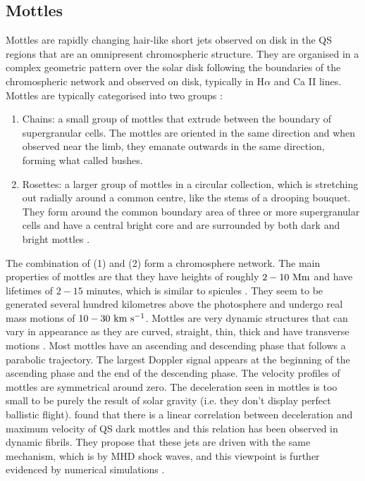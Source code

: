 \subsection{Mottles}
\label{subsec:mots}
Mottles are rapidly changing hair-like short jets observed on disk in the QS regions that are an omnipresent chromospheric structure. They are organised in a complex geometric pattern over the solar disk following the boundaries of the chromospheric network and observed on disk, typically in H$\alpha$ and Ca II lines. Mottles are typically categorised into two groups \citep{Beckers1963ApJ138648B}:
\begin{enumerate}
\item Chains: a small group of mottles that extrude between the boundary of supergranular cells. The mottles are oriented in the same direction and when observed near the limb, they emanate outwards in the same direction, forming what \cite{Cragg1963ApJ138303C} called bushes.
\item Rosettes: a larger group of mottles in a circular collection, which is stretching out radially around a common centre, like the stems of a drooping bouquet. They form around the common boundary area of three or more supergranular cells and have a central bright core and are surrounded by both dark and bright mottles \citep{Tsiropoula2012}.    
\end{enumerate}
The combination of (1) and (2) form a chromosphere network. The main properties of mottles are that they have heights of roughly $2-10~\rm{Mm}$ and have lifetimes of $2-15$ minutes, which is similar to spicules \citep{Suematsu1995ApJ}. They seem to be generated several hundred kilometres above the photosphere and undergo real mass motions of $10-30~\rm{km ~s^{-1}}$. Mottles are very dynamic structures that can vary in appearance as they are curved, straight, thin, thick and have transverse motions \citep{De_Pontieu2007ApJ}. Most mottles have an ascending and descending phase that follows a parabolic trajectory. The largest Doppler signal appears at the beginning of the ascending phase and the end of the descending phase. The velocity profiles of mottles are symmetrical around zero. The deceleration seen in mottles is too small to be purely the result of solar gravity (i.e. they don't display perfect ballistic flight). \cite{Rouppe2007ApJ660L169R} found that there is a linear correlation between deceleration and maximum velocity of QS dark mottles and this relation has been observed in dynamic fibrils. They propose that these jets are driven with the same mechanism, which is by MHD shock waves, and this viewpoint is further evidenced by numerical simulations \citep{De_Pontieu2007ApJ, Hansteen2006ApJ}. \np
